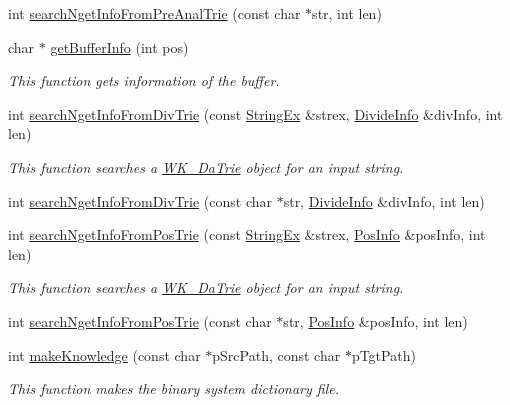 \begin{CompactItemize}
int \hyperlink{classkmaOrange_1_1Dictionary_6f7f3b672bdf9237c59382bbc91cca0e}{searchNgetInfoFromPreAnalTrie} (const char $\ast$str, int len)
\item 
char $\ast$ \hyperlink{classkmaOrange_1_1Dictionary_77314f5503275a31fda9b61bc2744ff0}{getBufferInfo} (int pos)
\begin{CompactList}\small\item\em This function gets information of the buffer. \item\end{CompactList}\item 
int \hyperlink{classkmaOrange_1_1Dictionary_ad13925876b52d5e15ad8a9063dd21c4}{searchNgetInfoFromDivTrie} (const \hyperlink{classStringEx}{StringEx} \&strex, \hyperlink{classDivideInfo}{DivideInfo} \&divInfo, int len)
\begin{CompactList}\small\item\em This function searches a \hyperlink{classkmaOrange_1_1WK__DaTrie}{WK\_\-DaTrie} object for an input string. \item\end{CompactList}\item 
int \hyperlink{classkmaOrange_1_1Dictionary_146b66480316ce2cdce51b9a762064be}{searchNgetInfoFromDivTrie} (const char $\ast$str, \hyperlink{classDivideInfo}{DivideInfo} \&divInfo, int len)
\item 
int \hyperlink{classkmaOrange_1_1Dictionary_7d2d37b55370baed7780214767862ce6}{searchNgetInfoFromPosTrie} (const \hyperlink{classStringEx}{StringEx} \&strex, \hyperlink{classPosInfo}{PosInfo} \&posInfo, int len)
\begin{CompactList}\small\item\em This function searches a \hyperlink{classkmaOrange_1_1WK__DaTrie}{WK\_\-DaTrie} object for an input string. \item\end{CompactList}\item 
int \hyperlink{classkmaOrange_1_1Dictionary_d95dd9fbf856d49cfd84a1c081f37959}{searchNgetInfoFromPosTrie} (const char $\ast$str, \hyperlink{classPosInfo}{PosInfo} \&posInfo, int len)
\item 
int \hyperlink{classkmaOrange_1_1Dictionary_3f754de6a90c39753b6620f089be7b85}{makeKnowledge} (const char $\ast$pSrcPath, const char $\ast$pTgtPath)
\begin{CompactList}\small\item\em This function makes the binary system dictionary file. \item\end{CompactList}\item 

\end{CompactItemize}
